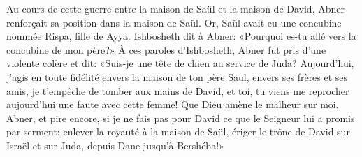 Au cours de cette guerre entre la maison de Saül et la maison de David,
	Abner renforçait sa position dans la maison de Saül.
Or, Saül avait eu une concubine nommée Rispa, fille de Ayya.
Ishbosheth dit à Abner:
	«Pourquoi es-tu allé vers la concubine de mon père?»
À ces paroles d’Ishbosheth, Abner fut pris d’une violente colère et dit:
	«Suis-je une tête de chien au service de Juda?
	Aujourd’hui, j’agis en toute fidélité envers la maison de ton père Saül,
	envers ses frères et ses amis, je t’empêche de tomber aux mains de David,
	et toi, tu viens me reprocher aujourd’hui une faute avec cette femme!
Que Dieu amène le malheur sur moi, Abner, et pire encore,
	si je ne fais pas pour David ce que le Seigneur lui a promis par serment:
	enlever la royauté à la maison de Saül,
	ériger le trône de David sur Israël et sur Juda, depuis Dane jusqu’à Bershéba!»
